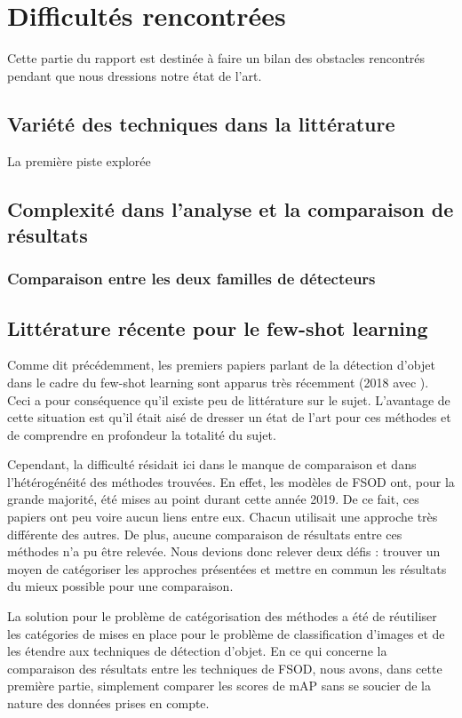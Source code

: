 \chapter{Difficultés rencontrées}
\label{chap:difficultes}
Cette partie du rapport est destinée à faire un bilan des obstacles rencontrés pendant que nous dressions notre état de l'art.



\section{Variété des techniques dans la littérature}
La première piste explorée 


\section{Complexité dans l'analyse et la comparaison de résultats}
\label{sec:complexite-comparaison}

\subsection*{Comparaison entre les deux familles de détecteurs}


\section{Littérature récente pour le few-shot learning}
Comme dit précédemment, les premiers papiers parlant de la détection d'objet dans le cadre du few-shot learning sont apparus très récemment (2018 avec \cite{DBLP:journals/corr/abs-1804-08328}). Ceci a pour conséquence qu'il existe peu de littérature sur le sujet. L'avantage de cette situation est qu'il était aisé de dresser un état de l'art pour ces méthodes et de comprendre en profondeur la totalité du sujet.

Cependant, la difficulté résidait ici dans le manque de comparaison et dans l'hétérogénéité des méthodes trouvées. En effet, les modèles de FSOD ont, pour la grande majorité, été mises au point durant cette année 2019. De ce fait, ces papiers ont peu voire aucun liens entre eux. Chacun utilisait une approche très différente des autres. De plus, aucune comparaison de résultats entre ces méthodes n'a pu être relevée. Nous devions donc relever deux défis : trouver un moyen de catégoriser les approches présentées et mettre en commun les résultats du mieux possible pour une comparaison.

La solution pour le problème de catégorisation des méthodes a été de réutiliser les catégories de \cite{DBLP:journals/corr/abs-1904-05046} mises en place pour le problème de classification d'images et de les étendre aux techniques de détection d'objet. En ce qui concerne la comparaison des résultats entre les techniques de FSOD, nous avons, dans cette première partie, simplement comparer les scores de mAP sans se soucier de la nature des données prises en compte.